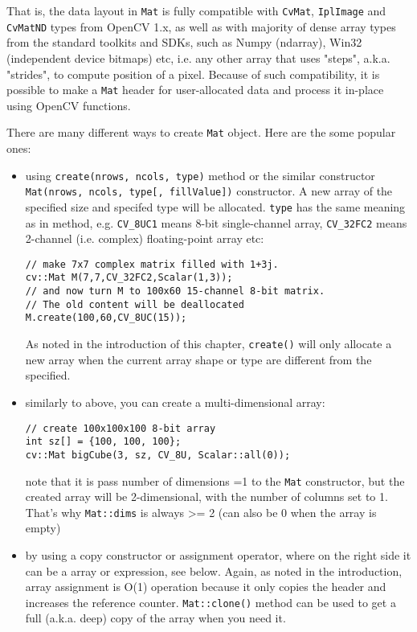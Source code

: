 That is, the data layout in \texttt{Mat} is fully compatible with \texttt{CvMat}, \texttt{IplImage} and \texttt{CvMatND} types from OpenCV 1.x, as well as with majority of dense array types from the standard toolkits and SDKs, such as Numpy (ndarray), Win32 (independent device bitmaps) etc, i.e. any other array that uses "steps", a.k.a. "strides", to compute position of a pixel. Because of such compatibility, it is possible to make a \texttt{Mat} header for user-allocated data and process it in-place using OpenCV functions.

There are many different ways to create \texttt{Mat} object. Here are the some popular ones:
\begin{itemize}
\item using \texttt{create(nrows, ncols, type)} method or
    the similar constructor \texttt{Mat(nrows, ncols, type[, fillValue])} constructor.
    A new array of the specified size and specifed type will be allocated.
    \texttt{type} has the same meaning as in  method,
    e.g. \texttt{CV\_8UC1} means 8-bit single-channel array,
    \texttt{CV\_32FC2} means 2-channel (i.e. complex) floating-point array etc:
        
\begin{lstlisting}
// make 7x7 complex matrix filled with 1+3j.
cv::Mat M(7,7,CV_32FC2,Scalar(1,3));
// and now turn M to 100x60 15-channel 8-bit matrix.
// The old content will be deallocated
M.create(100,60,CV_8UC(15));
\end{lstlisting}
        
    As noted in the introduction of this chapter, \texttt{create()}
    will only allocate a new array when the current array shape
    or type are different from the specified.

\item similarly to above, you can create a multi-dimensional array:

\begin{lstlisting}
// create 100x100x100 8-bit array
int sz[] = {100, 100, 100};
cv::Mat bigCube(3, sz, CV_8U, Scalar::all(0));
\end{lstlisting}

note that it is pass number of dimensions =1 to the \texttt{Mat} constructor, but the created array will be 2-dimensional, with the number of columns set to 1. That's why \texttt{Mat::dims} is always >= 2 (can also be 0 when the array is empty)
        
\item by using a copy constructor or assignment operator, where on the right side it can
      be a array or expression, see below. Again, as noted in the introduction,
      array assignment is O(1) operation because it only copies the header
      and increases the reference counter. \texttt{Mat::clone()} method can be used to get a full
      (a.k.a. deep) copy of the array when you need it.
          

\end{itemize}
